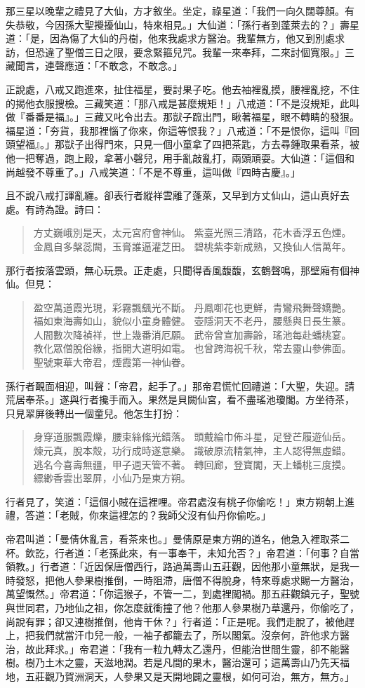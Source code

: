 那三星以晚輩之禮見了大仙，方才敘坐。坐定，祿星道：「我們一向久闊尊顏。有失恭敬，今因孫大聖攪擾仙山，特來相見。」大仙道：「孫行者到蓬萊去的？」壽星道：「是，因為傷了大仙的丹樹，他來我處求方醫治。我輩無方，他又到別處求訪，但恐違了聖僧三日之限，要念緊箍兒咒。我輩一來奉拜，二來討個寬限。」三藏聞言，連聲應道：「不敢念，不敢念。」

正說處，八戒又跑進來，扯住福星，要討果子吃。他去袖裡亂摸，腰裡亂挖，不住的揭他衣服搜檢。三藏笑道：「那八戒是甚麼規矩！」八戒道：「不是沒規矩，此叫做『番番是福』。」三藏又叱令出去。那獃子䠚出門，瞅著福星，眼不轉睛的發狠。福星道：「夯貨，我那裡惱了你來，你這等恨我？」八戒道：「不是恨你，這叫『回頭望福』。」那獃子出得門來，只見一個小童拿了四把茶匙，方去尋鍾取果看茶，被他一把奪過，跑上殿，拿著小磬兒，用手亂敲亂打，兩頭頑耍。大仙道：「這個和尚越發不尊重了。」八戒笑道：「不是不尊重，這叫做『四時吉慶』。」

且不說八戒打諢亂纏。卻表行者縱祥雲離了蓬萊，又早到方丈仙山，這山真好去處。有詩為證。詩曰：
\begin{quote}
方丈巍峨別是天，太元宮府會神仙。
紫臺光照三清路，花木香浮五色煙。
金鳳自多槃蕊闕，玉膏誰逼灌芝田。
碧桃紫李新成熟，又換仙人信萬年。
\end{quote}

那行者按落雲頭，無心玩景。正走處，只聞得香風馥馥，玄鶴聲鳴，那壁廂有個神仙。但見：
\begin{quote}
盈空萬道霞光現，彩霧飄颻光不斷。
丹鳳啣花也更鮮，青鸞飛舞聲嬌艷。
福如東海壽如山，貌似小童身體健。
壺隱洞天不老丹，腰懸與日長生篆。
人間數次降禎祥，世上幾番消厄願。
武帝曾宣加壽齡，瑤池每赴蟠桃宴。
教化眾僧脫俗緣，指開大道明如電。
也曾跨海祝千秋，常去靈山參佛面。
聖號東華大帝君，煙霞第一神仙眷。
\end{quote}

孫行者靦面相迎，叫聲：「帝君，起手了。」那帝君慌忙回禮道：「大聖，失迎。請荒居奉茶。」遂與行者攙手而入。果然是貝闕仙宮，看不盡瑤池瓊閣。方坐待茶，只見翠屏後轉出一個童兒。他怎生打扮：
\begin{quote}
身穿道服飄霞爍，腰束絲絛光錯落。
頭戴綸巾佈斗星，足登芒履遊仙岳。
煉元真，脫本殼，功行成時遂意樂。
識破原流精氣神，主人認得無虛錯。
逃名今喜壽無疆，甲子週天管不著。
轉回廊，登寶閣，天上蟠桃三度摸。
縹緲香雲出翠屏，小仙乃是東方朔。
\end{quote}

行者見了，笑道：「這個小賊在這裡哩。帝君處沒有桃子你偷吃！」東方朔朝上進禮，答道：「老賊，你來這裡怎的？我師父沒有仙丹你偷吃。」

帝君叫道：「曼倩休亂言，看茶來也。」曼倩原是東方朔的道名，他急入裡取茶二杯。飲訖，行者道：「老孫此來，有一事奉干，未知允否？」帝君道：「何事？自當領教。」行者道：「近因保唐僧西行，路過萬壽山五莊觀，因他那小童無狀，是我一時發怒，把他人參果樹推倒，一時阻滯，唐僧不得脫身，特來尊處求賜一方醫治，萬望慨然。」帝君道：「你這猴子，不管一二，到處裡闖禍。那五莊觀鎮元子，聖號與世同君，乃地仙之祖，你怎麼就衝撞了他？他那人參果樹乃草還丹，你偷吃了，尚說有罪；卻又連樹推倒，他肯干休？」行者道：「正是呢。我們走脫了，被他趕上，把我們就當汗巾兒一般，一袖子都籠去了，所以閣氣。沒奈何，許他求方醫治，故此拜求。」帝君道：「我有一粒九轉太乙還丹，但能治世間生靈，卻不能醫樹。樹乃土木之靈，天滋地潤。若是凡間的果木，醫治還可；這萬壽山乃先天福地，五莊觀乃賀洲洞天，人參果又是天開地闢之靈根，如何可治，無方，無方。」

